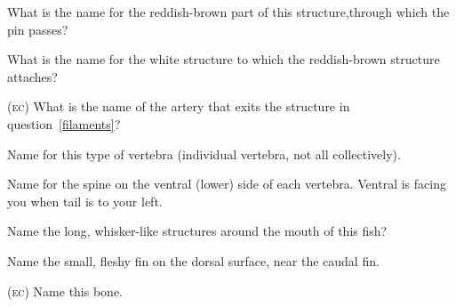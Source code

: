 \documentclass{exam}
\begin{document}
\begin{questions}
{%



\question What is the name for the reddish-brown part of this structure,\newline through which the pin passes? \label{filaments}

\question What is the name for the white structure \newline to which the reddish-brown structure attaches?

\question \textsc{(ec)}
What is the name of the artery that exits the structure in question~\ref{filaments}?


\vspace{2\baselineskip}



\question Name for this type of vertebra (individual vertebra, not all collectively).

\question Name for the spine on the ventral (lower) side  of each vertebra. Ventral is facing you when tail is to your left.

\vspace{2\baselineskip}

\question Name the long, whisker-like structures around the mouth of this fish?

\question Name the small, fleshy fin on the dorsal surface, near the caudal fin.


\bonusquestion \textsc{(ec)} Name this bone.

} %

\end{questions}





\end{document}
